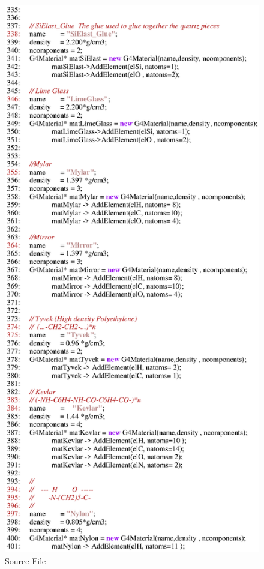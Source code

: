 \begin{figure}[h]
  \hspace{0cm}
  \includegraphics[scale=0.8]{./figures17/QweakSimMaterial.cc-p6.eps}
  \caption{\label{SourceXVII7} Source File}
           \label{fig:XVII-SC-7}
\end{figure}
\clearpage

